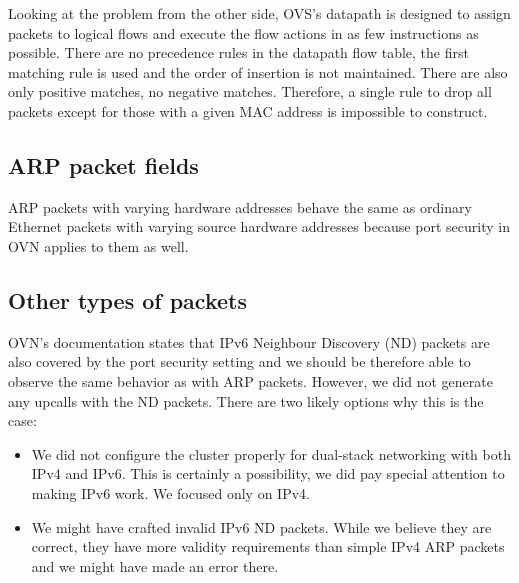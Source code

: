 Looking at the problem from the other side, OVS's datapath is designed to assign packets to logical flows and execute the flow actions in as few instructions as possible. There are no precedence rules in the datapath flow table, the first matching rule is used and the order of insertion is not maintained. There are also only positive matches, no negative matches. Therefore, a single rule to drop all packets except for those with a given MAC address is impossible to construct.



\subsection{ARP packet fields}

ARP packets with varying hardware addresses behave the same as ordinary Ethernet packets with varying source hardware addresses because port security in OVN applies to them as well.

\subsection{Other types of packets}

OVN's documentation states that IPv6 Neighbour Discovery (ND) packets are also covered by the port security setting and we should be therefore able to observe the same behavior as with ARP packets. However, we did not generate any upcalls with the ND packets. There are two likely options why this is the case:

\begin{itemize}
    \item We did not configure the cluster properly for dual-stack networking with both IPv4 and IPv6. This is certainly a possibility, we did pay special attention to making IPv6 work. We focused only on IPv4.

    \item We might have crafted invalid IPv6 ND packets. While we believe they are correct, they have more validity requirements than simple IPv4 ARP packets and we might have made an error there.
\end{itemize}

